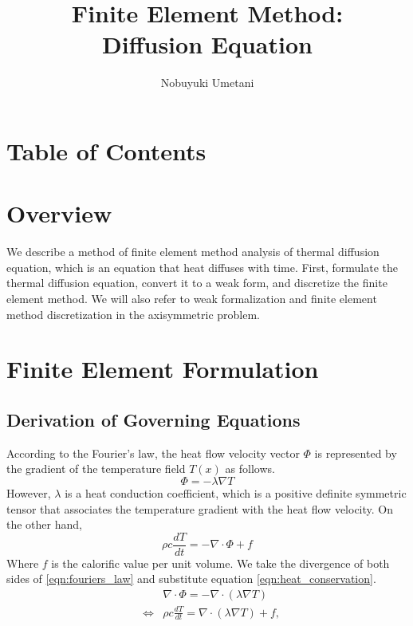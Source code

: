 

\title{Finite Element Method:\\ Diffusion Equation}
\author{Nobuyuki Umetani}


\maketitle
\tableofcontents




\section{Table of Contents}

\section{Overview}

We describe a method of finite element method analysis of thermal diffusion equation, which is an equation that heat diffuses with time. First, formulate the thermal diffusion equation, convert it to a weak form, and discretize the finite element method. We will also refer to weak formalization and finite element method discretization in the axisymmetric problem.


\section{Finite Element Formulation}
\subsection{Derivation of Governing Equations}
%
According to the Fourier's law, the heat flow velocity vector $\Phi$ is represented by the gradient of the temperature field $T(x)$ as follows.
%
\begin{equation}
\label{eqn:fouriers_law}
\Phi = -\lambda\nabla T
\end{equation}
%
However, $\lambda$ is a heat conduction coefficient, which is a positive definite symmetric tensor that associates the temperature gradient with the heat flow velocity.
%
On the other hand,
%
\begin{equation}
\label{eqn:heat_conservation}
\rho c \frac{dT}{dt}= -\nabla\cdot\Phi + f
\end{equation}
%
Where $f$ is the calorific value per unit volume.
%
We take the divergence of both sides of \eqref{eqn:fouriers_law} and substitute equation \eqref{eqn:heat_conservation}.
%
\begin{eqnarray}
&&\nabla\cdot\Phi = -\nabla\cdot(\lambda\nabla T)\\        
&\Leftrightarrow& \rho c \frac{dT}{dt} = \nabla\cdot(\lambda\nabla T) + f,
\end{eqnarray}

